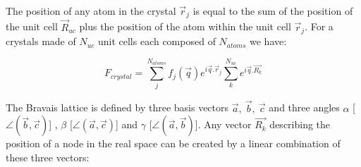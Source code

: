 The position of any atom in the crystal $\vec{r}_j$ is equal to the sum of the position of the unit cell $\vec{R}_{uc}$ plus the position of the atom within the unit cell $\vec{r}_j$.
For a crystals made of $N_{uc}$ unit cells each composed of $N_{atoms}$ we have:

\begin{equation}
    F_{crystal} = \sum_j^{N_{atoms}} f_j(\vec{q}) e^{i\vec{q}.\vec{r}_j} \sum_k^{N_{uc}} e^{i\vec{q}.\vec{R_k}}
    \label{eq:Fcrystal}
\end{equation}







The Bravais lattice is defined by three basis vectors $\vec{a},\ \vec{b},\ \vec{c}$ and three angles $\alpha$ [$\angle (\vec{b}, \vec{c})$] , $\beta$ [$\angle (\vec{a}, \vec{c})$] and $\gamma$ [$\angle (\vec{a}, \vec{b})$].
Any vector $\vec{R_k}$ describing the position of a node in the real space can be created by a linear combination of these three vectors:

